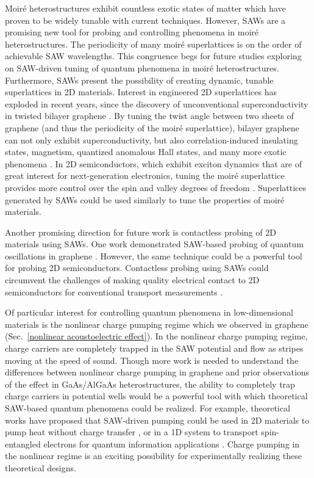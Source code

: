 \documentclass{beavtex_dub_edit}
\begin{document}
Moiré heterostructures exhibit countless exotic states of matter which have proven to be widely tunable with current techniques. However, SAWs are a promising new tool for probing and controlling phenomena in moiré heterostructures. The periodicity of many moiré superlattices is on the order of achievable SAW wavelengths. This congruence begs for future studies exploring on SAW-driven tuning of quantum phenomena in moiré heterostructures. Furthermore, SAWs present the possibility of creating dynamic, tunable superlattices in 2D materials. Interest in engineered 2D superlattices has exploded in recent years, since the discovery of unconventional superconductivity in twisted bilayer graphene \cite{cao_unconventional_2018}. By tuning the twist angle between two sheets of graphene (and thus the periodicity of the moiré superlattice), bilayer graphene can not only exhibit superconductivity, but also correlation-induced insulating states, magnetism, quantized anomalous Hall states, and many more exotic phenomena \cite{andrei_graphene_2020}. In 2D semiconductors, which exhibit exciton dynamics that are of great interest for next-generation electronics, tuning the moiré superlattice provides more control over the spin and valley degrees of freedom \cite{ciarrocchi_excitonic_2022}. Superlattices generated by SAWs could be used similarly to tune the properties of moiré materials. 

Another promising direction for future work is contactless probing of 2D materials using SAWs. One work demonstrated SAW-based probing of quantum oscillations in graphene \cite{fang_quantum_2023}. However, the same technique could be a powerful tool for probing 2D semiconductors. Contactless probing using SAWs could circumvent the challenges of making quality electrical contact to 2D semiconductors for conventional transport measurements \cite{miao_recent_2022}. 

Of particular interest for controlling quantum phenomena in low-dimensional materials is the nonlinear charge pumping regime which we observed in graphene (Sec.\ \ref{nonlinear acoustoelectric effect}). In the nonlinear charge pumping regime, charge carriers are completely trapped in the SAW potential and flow as stripes moving at the speed of sound. Though more work is needed to understand the differences between nonlinear charge pumping in graphene and prior observations of the effect in GaAs/AlGaAs heterostructures, the ability to completely trap charge carriers in potential wells would be a powerful tool with which theoretical SAW-based quantum phenomena could be realized. For example, theoretical works have proposed that SAW-driven pumping could be used in 2D materials to pump heat without charge transfer \cite{andreev_electronic_2022}, or in a 1D system to transport spin-entangled electrons for quantum information applications \cite{giavaras_quantum_2006}. Charge pumping in the nonlinear regime is an exciting possibility for experimentally realizing these theoretical designs.
\end{document}
